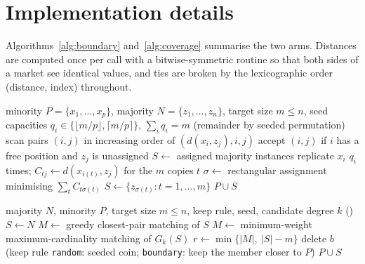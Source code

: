 \section{Implementation details}\label{app:implementation}

Algorithms~\ref{alg:boundary} and~\ref{alg:coverage} summarise the two arms. Distances are computed once per call with a bitwise-symmetric routine so that both sides of a market see identical values, and ties are broken by the lexicographic order (distance, index) throughout.

\begin{algorithm}[htbp]
\caption{Boundary arm: \MUSBS{} and \MUSBO}\label{alg:boundary}
\begin{algorithmic}[1]
\Require minority $P=\{x_1,\dots,x_p\}$, majority $N=\{z_1,\dots,z_n\}$, target size $m\le n$, seed
\State capacities $q_i\in\{\lfloor m/p\rfloor,\lceil m/p\rceil\}$, $\sum_i q_i=m$ (remainder by seeded permutation)
\If{\MUSBS}
  \State scan pairs $(i,j)$ in increasing order of $(d(x_i,z_j),i,j)$ 
  \State accept $(i,j)$ if $i$ has a free position and $z_j$ is unassigned
  \State $S\gets$ assigned majority instances 
\Else \Comment{\MUSBO}
  \State replicate $x_i$ $q_i$ times; $C_{tj}\gets d(x_{i(t)},z_j)$ for the $m$ copies $t$
  \State $\sigma\gets$ rectangular assignment minimising $\sum_t C_{t\sigma(t)}$ 
  \State $S\gets\{z_{\sigma(t)}:t=1,\dots,m\}$ 
\EndIf
\State \Return $P\cup S$
\end{algorithmic}
\end{algorithm}

\begin{algorithm}[htbp]
\caption{Coverage arm: \MUSCS{} and \MUSCO}\label{alg:coverage}
\begin{algorithmic}[1]
\Require majority $N$, minority $P$, target size $m\le n$, keep rule, seed, candidate degree $k$ (\MUSCO)
\State $S\gets N$
  \If{\MUSCS} \State $M\gets$ greedy closest-pair matching of $S$ 
  \Else \State $M\gets$ minimum-weight maximum-cardinality matching of $G_k(S)$ 
  \EndIf
  \State $r\gets\min\{|M|,\ |S|-m\}$ 
     \State delete $b$ (keep rule \texttt{random}: seeded coin; \texttt{boundary}: keep the member closer to $P$)
  \EndFor
\EndWhile
\State \Return $P\cup S$
\end{algorithmic}
\end{algorithm}

